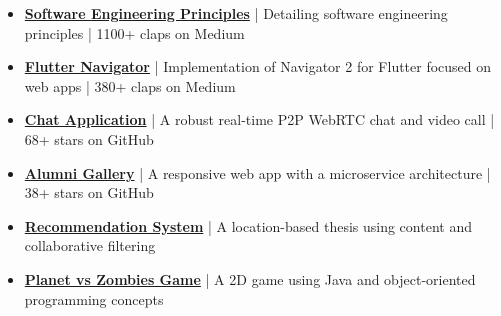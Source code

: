 \documentclass[letterpaper,11pt]{article}
\begin{document}


\begin{itemize}[leftmargin=*, noitemsep, topsep=0pt, partopsep=0pt]
      \item
            \href{https://medium.com/flutter-community/the-software-engineering-approach-in-cross-platform-programming-with-flutter-part-1-efcdc8a8fc26?source=friends_link&sk=ceb60f56685ce66c7f9574595748f25b}
            {\textbf{Software Engineering Principles}} | Detailing software engineering principles | 1100+ claps on Medium

      \item \BigGap
            \href{https://medium.com/flutter-community/lets-make-the-flutter-navigator-2-bc5953251c3e?source=friends_link&sk=e1ff30235ab93276b558c5b5ef1dd15f}
            {\textbf{Flutter Navigator}} | Implementation of Navigator 2 for Flutter focused on web apps | 380+ claps on Medium

      \item \BigGap
            \href{https://github.com/aliyazdi75/flutter_chat}
            {\textbf{Chat Application}} | A robust real-time P2P WebRTC chat and video call | 68+ stars on GitHub

      \item \BigGap
            \href{https://gallery.yazdi.dev}
            {\textbf{Alumni Gallery}} | A responsive web app with a microservice architecture | 38+ stars on GitHub

      \item \BigGap
            \href{https://raw.githubusercontent.com/aliyazdi75/Resume/main/BScThesis-Abstract.pdf}
            {\textbf{Recommendation System}} | A location-based thesis using content and collaborative filtering

      \item \BigGap
            \href{https://github.com/aliyazdi75/Planet_vs_Zombies}
            {\textbf{Planet vs Zombies Game}} | A 2D game using Java and object-oriented programming concepts

\end{itemize}



\end{document}
